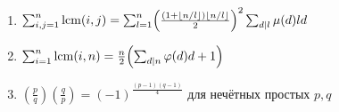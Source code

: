 \begin{enumerate}
\item %
$\sum_{i,j=1}^n\operatorname{lcm}(i,j)
=\sum_{l=1}^n\Bigl(\frac{(1+\lfloor n/l\rfloor)\lfloor n/l\rfloor}{2}\Bigr)^2\sum_{d\mid l}\mu(d)ld$

\item %
$\sum_{i=1}^n\operatorname{lcm}(i,n)=\frac{n}{2}\Bigl(\sum_{d\mid n}\varphi(d)d+1\Bigr)$

\item %
$\left(\tfrac{p}{q}\right)\left(\tfrac{q}{p}\right)=(-1)^{\frac{(p-1)(q-1)}{4}}$
 для нечётных простых $p,q$

\end{enumerate}

\endgroup


